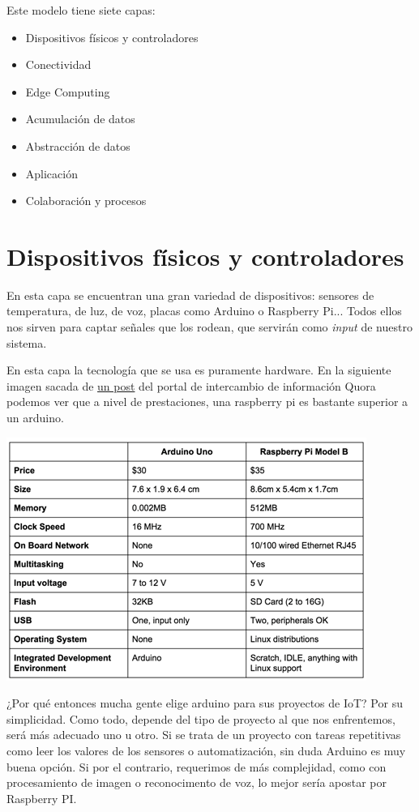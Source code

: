 \documentclass{article}
\begin{document}
Este modelo tiene siete capas:

\begin{itemize}
\item Dispositivos físicos y controladores
\item Conectividad
\item Edge Computing
\item Acumulación de datos
\item Abstracción de datos
\item Aplicación
\item Colaboración y procesos
\end{itemize}

\section{Dispositivos físicos y controladores}

En esta capa se encuentran una gran variedad de dispositivos: sensores de temperatura, de luz, de voz, placas como Arduino o Raspberry Pi... Todos ellos nos sirven para captar señales que los rodean, que servirán como \textit{input} de nuestro sistema.

En esta capa la tecnología que se usa es puramente hardware. En la siguiente imagen sacada de \href{https://www.quora.com/Which-is-better-Arduino-or-raspberry-pi-in-regard-to-IOT-projects-with-them}{un post} del portal de intercambio de información Quora podemos ver que a nivel de prestaciones, una raspberry pi es bastante superior a un arduino.

\begin{center}
\includegraphics[scale=0.4]{images/arduinovsrpi.png}
\end{center}

¿Por qué entonces mucha gente elige arduino para sus proyectos de IoT? Por su simplicidad. Como todo, depende del tipo de proyecto al que nos enfrentemos, será más adecuado uno u otro. Si se trata de un proyecto con tareas repetitivas como leer los valores de los sensores o automatización, sin duda Arduino es muy buena opción. Si por el contrario, requerimos de más complejidad, como con procesamiento de imagen o reconocimento de voz, lo mejor sería apostar por Raspberry PI.
\end{document}
